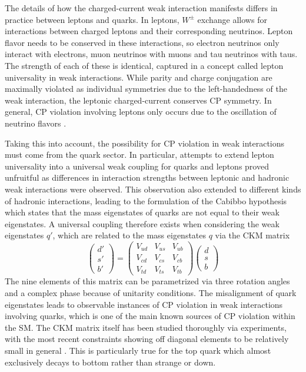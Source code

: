 The details of how the charged-current weak interaction manifests differs in practice between leptons and quarks. In 
leptons, $W^{\pm}$ exchange allows for interactions between charged leptons and their corresponding neutrinos. 
Lepton flavor needs to be conserved in these interactions, so electron neutrinos only interact with electrons, muon 
neutrinos with muons and tau neutrinos with taus. The strength of each of these is identical, captured in a concept 
called lepton universality in weak interactions. While parity and charge conjugation are maximally violated as 
individual symmetries due to the left-handedness of the weak interaction, the leptonic charged-current conserves 
CP symmetry. In general, CP violation involving leptons only occurs due to the oscillation of neutrino flavors 
\cite{bellini-neutrino-oscillations}. \par

Taking this into account, the possibility for CP violation in weak interactions must come from the quark sector. 
In particular, attempts to extend lepton universality into a universal weak coupling for quarks and leptons proved 
unfruitful as differences in interaction strengths between leptonic and hadronic weak interactions were observed. 
This observation also extended to different kinds of hadronic interactions, leading to the formulation of the Cabibbo 
hypothesis which states that the mass eigenstates of quarks are not equal to their weak eigenstates. A universal 
coupling therefore exists when considering the weak eigenstates $q'$, which are related to the mass eigenstates $q$ 
via the CKM matrix \cite{cabibbo-ckm-matrix, kobayashi-ckm-matrix}
\begin{equation}
\begin{pmatrix} d'  \\ s' \\ b' \end{pmatrix} =
\begin{pmatrix} V_{ud} & V_{us} & V_{ub} \\ V_{cd} & V_{cs} & V_{cb} \\ V_{td} & V_{ts} & V_{tb} \end{pmatrix}
\begin{pmatrix} d \\ s \\ b \end{pmatrix}
\end{equation}
The nine elements of this matrix can be parametrized via three rotation angles and a complex phase because of 
unitarity conditions. The misalignment of quark eigenstates leads to observable instances of CP violation in weak 
interactions involving quarks, which is one of the main known sources of CP violation within the SM. The 
CKM matrix itself has been studied thoroughly via experiments, with the most recent constraints showing off diagonal 
elements to be relatively small in general \cite{pdg-2024-review}. This is particularly true for the top quark which 
almost exclusively decays to bottom rather than strange or down.

